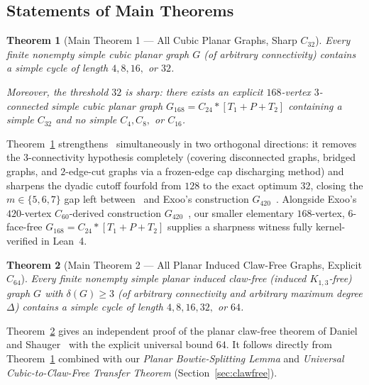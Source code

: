 \documentclass[11pt,reqno]{amsart}
\theoremstyle{plain}
\newtheorem{theorem}{Theorem}[section]
\theoremstyle{definition}
\theoremstyle{remark}
\DeclareRobustCommand{\_}{\ifmmode\text{\textunderscore}\else\textunderscore\allowbreak\fi}
\begin{document}
\subsection{Statements of Main Theorems}\label{subsec:statements}

\begin{theorem}[Main Theorem 1 --- All Cubic Planar Graphs, Sharp $C_{32}$]\label{thm:main1}
Every finite nonempty simple cubic planar graph $G$ (of arbitrary connectivity) contains a simple cycle of length $4, 8, 16,$ or $32$.

Moreover, the threshold $32$ is sharp: there exists an explicit $168$-vertex $3$-connected simple cubic planar graph $G_{168} = C_{24} * [T_1 + P + T_2]$ containing a simple $C_{32}$ and no simple $C_4, C_8,$ or $C_{16}$.
\end{theorem}

Theorem~\ref{thm:main1} strengthens~\cite{HeckmanKrakovski2013} simultaneously in two orthogonal directions: it removes the $3$-connectivity hypothesis completely (covering disconnected graphs, bridged graphs, and $2$-edge-cut graphs via a frozen-edge cap discharging method) and sharpens the dyadic cutoff fourfold from $128$ to the exact optimum $32$, closing the $m \in \{5, 6, 7\}$ gap left between~\cite{HeckmanKrakovski2013} and Exoo's construction $G_{420}$~\cite{Exoo2014}. Alongside Exoo's $420$-vertex $C_{60}$-derived construction $G_{420}$~\cite{Exoo2014}, our smaller elementary $168$-vertex, $6$-face-free $G_{168} = C_{24} * [T_1 + P + T_2]$ supplies a sharpness witness fully kernel-verified in Lean~4.

\begin{theorem}[Main Theorem 2 --- All Planar Induced Claw-Free Graphs, Explicit $C_{64}$]\label{thm:main2}
Every finite nonempty simple planar induced claw-free (induced $K_{1,3}$-free) graph $G$ with $\delta(G) \ge 3$ (of arbitrary connectivity and arbitrary maximum degree $\Delta$) contains a simple cycle of length $4, 8, 16, 32,$ or $64$.
\end{theorem}

Theorem~\ref{thm:main2} gives an independent proof of the planar claw-free theorem of Daniel and Shauger~\cite{DanielShauger2001} with the explicit universal bound $64$. It follows directly from Theorem~\ref{thm:main1} combined with our \emph{Planar Bowtie-Splitting Lemma} and \emph{Universal Cubic-to-Claw-Free Transfer Theorem} (Section~\ref{sec:clawfree}).
\end{document}

